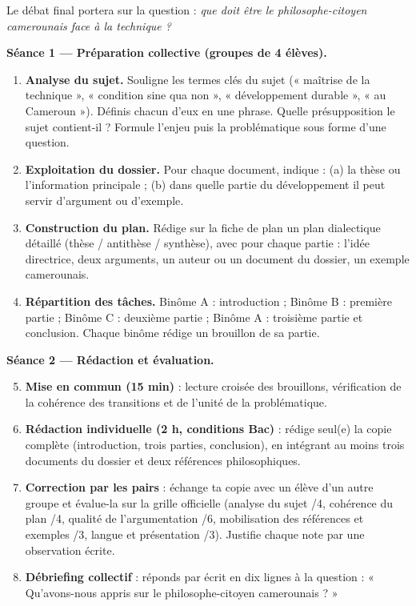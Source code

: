 \documentclass[11pt]{article}
\newcounter{popsec}
\newcounter{popsub}
\newcommand{\courssub}[1]{%
  \stepcounter{popsub}%
  \par\vspace{9pt}\noindent{\popxbold\fontsize{11.5}{13}\selectfont\color{popink}{\color{poporange}\thepopsec.\thepopsub}\hspace{6pt}#1}\par\nopagebreak\vspace{4pt}
}
\begin{document}
Le débat final portera sur la question : \emph{que doit être le philosophe-citoyen camerounais face à la technique ?}

\courssub{Consignes}

\textbf{Séance 1 — Préparation collective (groupes de 4 élèves).}

\begin{enumerate}
\item \textbf{Analyse du sujet.} Souligne les termes clés du sujet (« maîtrise de la technique », « condition sine qua non », « développement durable », « au Cameroun »). Définis chacun d'eux en une phrase. Quelle présupposition le sujet contient-il ? Formule l'enjeu puis la problématique sous forme d'une question.
\item \textbf{Exploitation du dossier.} Pour chaque document, indique : (a) la thèse ou l'information principale ; (b) dans quelle partie du développement il peut servir d'argument ou d'exemple.
\item \textbf{Construction du plan.} Rédige sur la fiche de plan un plan dialectique détaillé (thèse / antithèse / synthèse), avec pour chaque partie : l'idée directrice, deux arguments, un auteur ou un document du dossier, un exemple camerounais.
\item \textbf{Répartition des tâches.} Binôme A : introduction ; Binôme B : première partie ; Binôme C : deuxième partie ; Binôme A : troisième partie et conclusion. Chaque binôme rédige un brouillon de sa partie.
\end{enumerate}

\textbf{Séance 2 — Rédaction et évaluation.}

\begin{enumerate}
\setcounter{enumi}{4}
\item \textbf{Mise en commun (15 min)} : lecture croisée des brouillons, vérification de la cohérence des transitions et de l'unité de la problématique.
\item \textbf{Rédaction individuelle (2 h, conditions Bac)} : rédige seul(e) la copie complète (introduction, trois parties, conclusion), en intégrant au moins trois documents du dossier et deux références philosophiques.
\item \textbf{Correction par les pairs} : échange ta copie avec un élève d'un autre groupe et évalue-la sur la grille officielle (analyse du sujet /4, cohérence du plan /4, qualité de l'argumentation /6, mobilisation des références et exemples /3, langue et présentation /3). Justifie chaque note par une observation écrite.
\item \textbf{Débriefing collectif} : réponds par écrit en dix lignes à la question : « Qu'avons-nous appris sur le philosophe-citoyen camerounais ? »
\end{enumerate}
\end{document}
